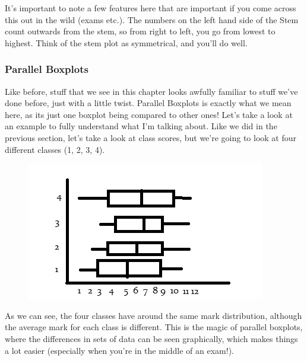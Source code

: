 \documentclass[11pt]{article}
\begin{document}
It's important to note a few features here that are important if you come across this out in the wild (exams etc.). The numbers on the left hand side of the Stem count outwards from the stem, so from right to left, you go from lowest to highest. Think of the stem plot as symmetrical, and you'll do well. 

\subsubsection*{Parallel Boxplots}

Like before, stuff that we see in this chapter looks awfully familiar to stuff we've done before, just with a little twist. Parallel Boxplots is exactly what we mean here, as its just one boxplot being compared to other ones! Let's take a look at an example to fully understand what I'm talking about. Like we did in the previous section, let's take a look at class scores, but we're going to look at four different classes (1, 2, 3, 4). 

\clearpage{}
\begin{figure}[htp]
\centering
\includegraphics[scale=1.00]{ParallelBoxplotsImage12.jpg}
\end{figure}

As we can see, the four classes have around the same mark distribution, although the average mark for each class is different. This is the magic of parallel boxplots, where the differences in sets of data can be seen graphically, which makes things a lot easier (especially when you're in the middle of an exam!).
\end{document}
